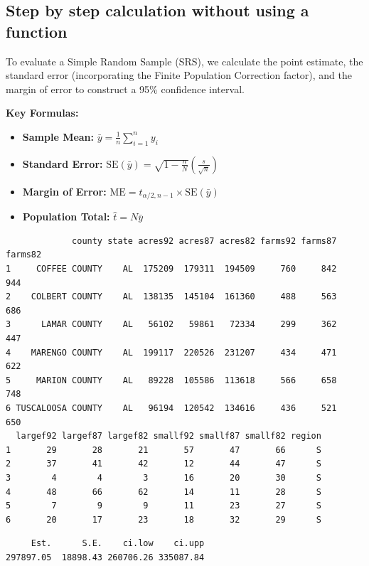 \documentclass[
  letterpaper,
  DIV=11,
  numbers=noendperiod]{scrreprt}
\providecommand{\tightlist}{%
  \setlength{\itemsep}{0pt}\setlength{\parskip}{0pt}}
\renewcommand{\[}{\begin{equation}}
\renewcommand{\]}{\end{equation}}
\begin{document}
\subsection{Step by step calculation without using a
function}\label{step-by-step-calculation-without-using-a-function}

To evaluate a Simple Random Sample (SRS), we calculate the point
estimate, the standard error (incorporating the Finite Population
Correction factor), and the margin of error to construct a 95\%
confidence interval.

\textbf{Key Formulas:}

\begin{itemize}
\tightlist
\item
  \textbf{Sample Mean:} \(\bar{y} = \frac{1}{n} \sum_{i=1}^n y_i\)
\item
  \textbf{Standard Error:}
  \(\mathrm{SE}(\bar{y}) = \sqrt{1 - \frac{n}{N}} \left( \frac{s}{\sqrt{n}} \right)\)
\item
  \textbf{Margin of Error:}
  \(\mathrm{ME} = t_{\alpha/2, n-1} \times \mathrm{SE}(\bar{y})\)
\item
  \textbf{Population Total:} \(\hat{t} = N\bar{y}\)
\end{itemize}

\begin{verbatim}
             county state acres92 acres87 acres82 farms92 farms87 farms82
1     COFFEE COUNTY    AL  175209  179311  194509     760     842     944
2    COLBERT COUNTY    AL  138135  145104  161360     488     563     686
3      LAMAR COUNTY    AL   56102   59861   72334     299     362     447
4    MARENGO COUNTY    AL  199117  220526  231207     434     471     622
5     MARION COUNTY    AL   89228  105586  113618     566     658     748
6 TUSCALOOSA COUNTY    AL   96194  120542  134616     436     521     650
  largef92 largef87 largef82 smallf92 smallf87 smallf82 region
1       29       28       21       57       47       66      S
2       37       41       42       12       44       47      S
3        4        4        3       16       20       30      S
4       48       66       62       14       11       28      S
5        7        9        9       11       23       27      S
6       20       17       23       18       32       29      S
\end{verbatim}

\begin{verbatim}
     Est.      S.E.    ci.low    ci.upp 
297897.05  18898.43 260706.26 335087.84 
\end{verbatim}
\end{document}
